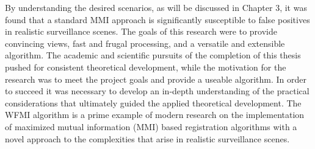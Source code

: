 By understanding the desired scenarios, as will be discussed in Chapter 3, it was found that a standard MMI approach is significantly susceptible to false positives in realistic surveillance scenes. The goals of this research were to provide convincing views, fast and frugal processing, and a versatile and extensible algorithm. The academic and scientific pursuits of the completion of this thesis pushed for consistent theoretical development, while the motivation for the research was to meet the project goals and provide a useable algorithm. In order to succeed it was necessary to develop an in-depth understanding of the practical considerations that ultimately guided the applied theoretical development. The WFMI algorithm is a prime example of modern research on the implementation of maximized mutual information (MMI) based registration algorithms with a novel approach to the complexities that arise in realistic surveillance scenes.



